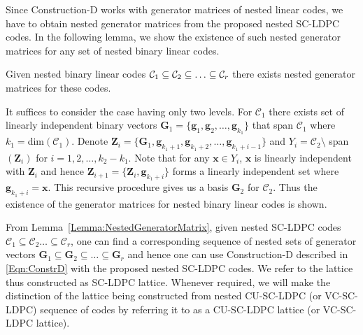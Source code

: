 \documentclass[journal,twocolumn]{IEEEtran}
\begin{document}
Since Construction-D works with generator matrices of nested linear codes, we have to obtain nested generator matrices from the proposed nested SC-LDPC codes. In the following lemma, we show the existence of such nested generator matrices for any set of nested binary linear codes.
\begin{lemma}\label{Lemma:NestedGeneratorMatrix}
    Given nested binary linear codes $\mathcal{C}_{1}\subseteq \mathcal{C}_{2}\subseteq\ldots \subseteq\mathcal{C}_{r}$ there exists nested generator matrices for these codes.
\end{lemma}
\begin{IEEEproof}
It suffices to consider the case having only two levels. For $\mathcal{C}_{1}$ there exists set of linearly independent binary vectors
$\mathbf{G}_{1}=\{\mathbf{g}_1,\mathbf{g}_2,\ldots, \mathbf{g}_{k_1}\}$ that span $\mathcal{C}_{1}$ where $k_{1}=$dim$(\mathcal{C}_{1})$.
Denote $\mathbf{Z}_{i}=\{\mathbf{G}_{1},\mathbf{g}_{k_{1}+1},\mathbf{g}_{k_{1}+2}, \ldots, \mathbf{g}_{k_{1}+i-1}\}$ and $Y_{i}=\mathcal{C}_{2}\setminus$
span$(\mathbf{Z}_{i})$ for $i=1,2, \ldots, k_{2}-k_{1}$. Note that for any $\mathbf{x}\in Y_{i}$, $\mathbf{x}$ is linearly independent with $\mathbf{Z}_{i}$ and hence
$\mathbf{Z}_{i+1}=\{\mathbf{Z}_{i},\mathbf{g}_{k_{1}+i}\}$ forms a linearly independent set where $\mathbf{g}_{k_{1}+i}=\mathbf{x}$. This recursive procedure gives us a basis $\mathbf{G}_{2}$ for $\mathcal{C}_{2}$. Thus the existence of the generator matrices for nested binary linear codes is shown.
\end{IEEEproof}
From Lemma~\ref{Lemma:NestedGeneratorMatrix}, given nested SC-LDPC codes $\mathcal{C}_{1}\subseteq \mathcal{C}_{2}\ldots \subseteq\mathcal{C}_{r}$, one can find a corresponding sequence of nested sets of generator vectors $\mathbf{G}_{1}\subseteq \mathbf{G}_{2} \subseteq \ldots \subseteq\mathbf{G}_{r}$ and hence one can use Construction-D described in \eqref{Eqn:ConstrD} with the proposed nested SC-LDPC codes. We refer to the lattice thus constructed as SC-LDPC lattice. Whenever required, we will make the distinction of the lattice being constructed from nested CU-SC-LDPC (or VC-SC-LDPC) sequence of codes by referring it to as a CU-SC-LDPC lattice (or VC-SC-LDPC lattice). 
\end{document}
